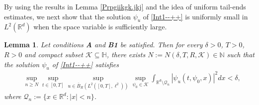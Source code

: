 \documentclass[11pt]{article}
\renewcommand{\geq}{\geqslant}  %
\newtheorem{lemma}[theorem]{Lemma}
\numberwithin{equation}{section}
\begin{document}
By using the results in Lemma \ref{Prpgiikgk.jkj} and the idea of uniform tail-ends
estimates, we next show that the solution $\psi_u$ of \eqref{Int1--++} is uniformly small in $L^2(\mathbb{R}^d)$ when the space variable is sufficiently large.


\begin{lemma}\label{tightness2ddfhtt}
Let conditions  {\bf A} and {\bf B1}
be satisfied. Then for every  $\delta>0$, $T>0$, $R>0$
and compact subset
$\mathcal{K}\subseteq \mathbb{H}$,
there exists $N:=N(\delta,T,R,\mathcal{K})
\in\mathbb{N}$ such that the solution $\psi_u$ of \eqref{Int1--++} satisfies
\begin{align*}&
\sup_{n\geq N}\sup_{t\in[0,T]}\sup_{u\in \overline{B}_{R}(L^2([0,T],\ell^2))}
\sup_{\psi_0\in\mathcal{K}}\int_{ {\mathbb{R}}^d \setminus
\mathcal{Q}_n}|\psi_u(t,\psi_0,x)|^2
dx
<\delta,
\end{align*}
where $\mathcal{Q}_n:=\{x\in\mathbb{R}^d:|x|< n\}$.
\end{lemma}
\end{document}
